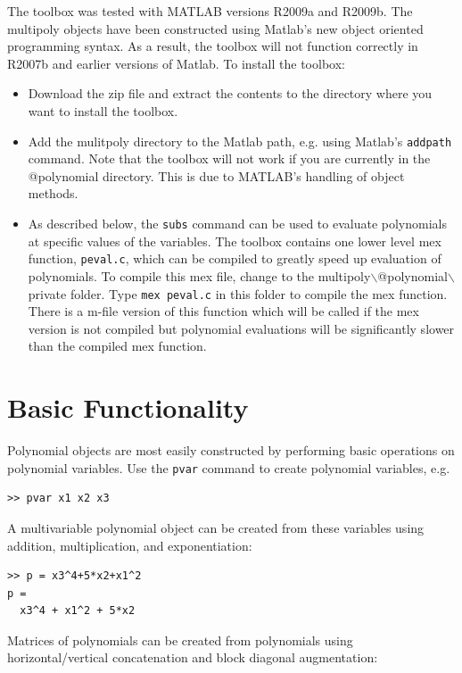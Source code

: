 \documentclass{article}
\begin{document}
The toolbox was tested with MATLAB versions R2009a and R2009b.  The
multipoly objects have been constructed using Matlab's new object
oriented programming syntax. As a result, the toolbox will not
function correctly in R2007b and earlier versions of Matlab. To
install the toolbox:
\begin{itemize}
\item Download the zip file and extract the contents to the directory
  where you want to install the toolbox.
\item Add the mulitpoly directory to the Matlab path, e.g. using
  Matlab's \texttt{addpath} command.  Note that the toolbox will not
  work if you are currently in the @polynomial directory.  This is due
  to MATLAB’s handling of object methods.
\item As described below, the \texttt{subs} command can be used to
  evaluate polynomials at specific values of the variables.  The
  toolbox contains one lower level mex function, \texttt{peval.c},
  which can be compiled to greatly speed up evaluation of polynomials.
  To compile this mex file, change to the
  multipoly$\backslash$@polynomial$\backslash$private folder.  Type
  \texttt{mex peval.c} in this folder to compile the mex function.
  There is a m-file version of this function which will be called if
  the mex version is not compiled but polynomial evaluations will be
  significantly slower than the compiled mex function.
\end{itemize}

\section{Basic Functionality}
\label{sec:basic}

Polynomial objects are most easily constructed by performing
basic operations on polynomial variables.  Use the \texttt{pvar}
command to create polynomial variables, e.g.

\begin{verbatim}
>> pvar x1 x2 x3
\end{verbatim}
A multivariable polynomial object can be created from these variables
using addition, multiplication, and exponentiation:

\begin{verbatim}
>> p = x3^4+5*x2+x1^2
p =
  x3^4 + x1^2 + 5*x2
\end{verbatim}
Matrices of polynomials can be created from polynomials using
horizontal/vertical concatenation and block diagonal augmentation:
\end{document}
